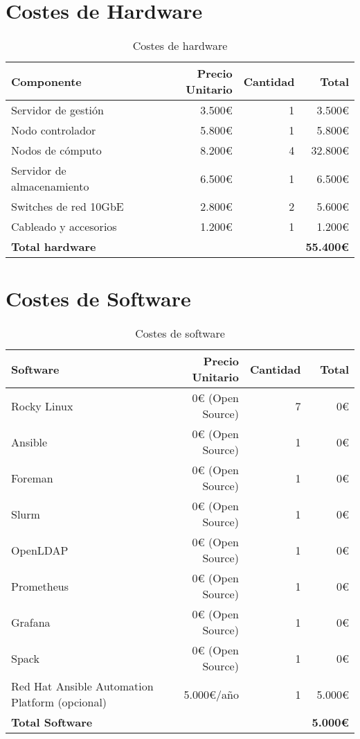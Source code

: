 \documentclass[12pt,a4paper]{report}
\begin{document}
\section{Costes de Hardware}

\begin{table}[H]
\centering
\begin{tabular}{|l|r|r|r|}
\hline
\textbf{Componente} & \textbf{Precio Unitario} & \textbf{Cantidad} & \textbf{Total} \\
\hline
Servidor de gestión & 3.500€ & 1 & 3.500€ \\
\hline
Nodo controlador & 5.800€ & 1 & 5.800€ \\
\hline
Nodos de cómputo & 8.200€ & 4 & 32.800€ \\
\hline
Servidor de almacenamiento & 6.500€ & 1 & 6.500€ \\
\hline
Switches de red 10GbE & 2.800€ & 2 & 5.600€ \\
\hline
Cableado y accesorios & 1.200€ & 1 & 1.200€ \\
\hline
\textbf{Total hardware} & & & \textbf{55.400€} \\
\hline
\end{tabular}
\caption{Costes de hardware}
\label{tab:costes_hardware}
\end{table}

\section{Costes de Software}

\begin{table}[H]
\centering
\begin{tabular}{|l|r|r|r|}
\hline
\textbf{Software} & \textbf{Precio Unitario} & \textbf{Cantidad} & \textbf{Total} \\
\hline
Rocky Linux & 0€ (Open Source) & 7 & 0€ \\
\hline
Ansible & 0€ (Open Source) & 1 & 0€ \\
\hline
Foreman & 0€ (Open Source) & 1 & 0€ \\
\hline
Slurm & 0€ (Open Source) & 1 & 0€ \\
\hline
OpenLDAP & 0€ (Open Source) & 1 & 0€ \\
\hline
Prometheus & 0€ (Open Source) & 1 & 0€ \\
\hline
Grafana & 0€ (Open Source) & 1 & 0€ \\
\hline
Spack & 0€ (Open Source) & 1 & 0€ \\
\hline
Red Hat Ansible Automation Platform (opcional) & 5.000€/año & 1 & 5.000€ \\
\hline
\textbf{Total Software} & & & \textbf{5.000€} \\
\hline
\end{tabular}
\caption{Costes de software}
\label{tab:costes_software}
\end{table}
\end{document}
